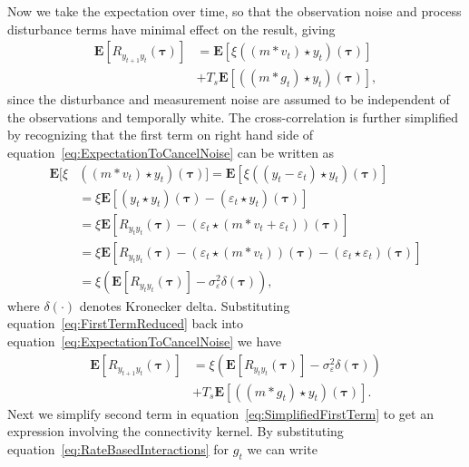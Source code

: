 \documentclass[conference,onecolumn]{IEEEtran}
\begin{document}
Now we take the expectation over time, so that the observation noise and process disturbance terms have minimal effect on the result, giving 
\begin{align}\label{eq:ExpectationToCancelNoise}
	\mathbf{E}[R_{y_{t+1}y_t}(\boldsymbol{\tau})] &= \mathbf{E}[\xi\left(\left(m \ast v_t\right) \star y_t \right)(\boldsymbol{\tau})] \nonumber \\
	 &+ T_s \mathbf{E}[\left(\left(m\ast g_t\right)\star y_t \right)(\boldsymbol{\tau})],
\end{align}
since the disturbance and measurement noise are assumed to be independent of the observations and temporally white. 
The cross-correlation is further simplified by recognizing that the first term on right hand side of equation~\ref{eq:ExpectationToCancelNoise} can be written as 
\begin{align}
	\mathbf{E}[\xi&\left(\left(m \ast v_t \right) \star y_t \right)(\boldsymbol{\tau})] = \mathbf{E}\left[\xi\left(\left(y_t-\varepsilon_t\right) \star y_t \right)(\boldsymbol{\tau})\right] \\
	&= \xi \mathbf{E}\left[ (y_t \star y_t)(\boldsymbol{\tau}) - \left(\varepsilon_t\star y_t \right)(\boldsymbol{\tau})\right] \\
	&= \xi\mathbf{E}[ R_{y_ty_t}(\boldsymbol{\tau})  - \left(\varepsilon_t \star (m\ast v_t + \varepsilon_t)\right) (\boldsymbol{\tau})] \\
	&=\xi\mathbf{E}[ R_{y_ty_t}(\boldsymbol{\tau}) -\left(\varepsilon_t\star (m\ast v_t)\right)(\boldsymbol{\tau}) - (\varepsilon_t\star\varepsilon_t)(\boldsymbol{\tau})] \\
	&= \xi\left(\mathbf{E}[ R_{y_ty_t}(\boldsymbol{\tau})] - \sigma_{\varepsilon}^2 \delta(\boldsymbol{\tau})\right), \label{eq:FirstTermReduced}
\end{align}
where $\delta\left(\cdot\right)$ denotes Kronecker delta. Substituting equation~\ref{eq:FirstTermReduced} back into equation~\ref{eq:ExpectationToCancelNoise} we have
\begin{align}\label{eq:SimplifiedFirstTerm}
	\mathbf{E}[R_{y_{t+1}y_t}(\boldsymbol{\tau})] &= \xi\left(\mathbf{E}[ R_{y_ty_t}(\boldsymbol{\tau})] - \sigma_{\varepsilon}^2 \delta(\boldsymbol{\tau})\right) \nonumber \\
	&+ T_s\mathbf{E}[ \left(\left(m\ast g_t\right)\star y_t \right)(\boldsymbol{\tau})].
\end{align}
Next we simplify second term in equation~\ref{eq:SimplifiedFirstTerm} to get an expression involving the connectivity kernel. By substituting equation~\ref{eq:RateBasedInteractions} for $g_t$ we can write
\end{document}
